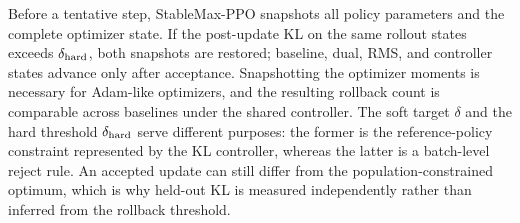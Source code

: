 \documentclass{article}
\newcommand{\method}{StableMax-PPO}
\theoremstyle{definition}
\theoremstyle{remark}
\begin{document}
Before a tentative step, \method{} snapshots all policy parameters and the
complete optimizer state.  If the post-update KL on the same rollout states
exceeds \(\delta_{\rm hard}\), both snapshots are restored; baseline, dual,
RMS, and controller states advance only after acceptance.  Snapshotting the
optimizer moments is necessary for Adam-like optimizers, and the resulting
rollback count is comparable across baselines under the shared controller.
The soft target \(\delta\) and the hard threshold \(\delta_{\rm hard}\) serve
different purposes: the former is the reference-policy constraint represented
by the KL controller, whereas the latter is a batch-level reject rule.  An
accepted update can still differ from the population-constrained optimum, which
is why held-out KL is measured independently rather than inferred from the
rollback threshold.
\end{document}
